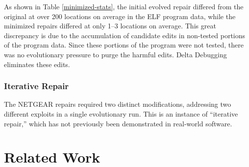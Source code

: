 \documentclass{sigcomm-alternate}
\begin{document}
As shown in Table \ref{minimized-stats}, the initial evolved repair
differed from the original at over 200 locations on average in the ELF
program data, while the minimized repairs differed at only 1--3
locations on average.  This great discrepancy is due to the
accumulation of candidate edits in non-tested portions of the program
data.  Since these portions of the program were not tested, there was
no evolutionary pressure to purge the harmful edits.  
Delta Debugging eliminates these edits.

\subsubsection{Iterative Repair}
\label{iterative-repair}
The NETGEAR  repairs required two distinct modifications, addressing two different
exploits in a single evolutionary run.  This is an instance of
``iterative repair,'' which has not previously been demonstrated in
real-world software.

%


\section{Related Work}
\label{sec:related-work}
\end{document}
